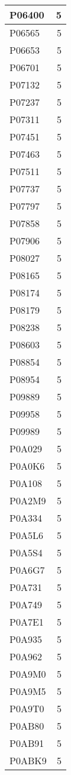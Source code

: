 \documentclass[
]{book}
\theoremstyle{definition}
\theoremstyle{definition}
\theoremstyle{definition}
\theoremstyle{definition}
\theoremstyle{remark}
\begin{document}
\begin{table}
\begin{tabular}{l|r}
\hline
P06400 & 5\\
\hline
P06565 & 5\\
\hline
P06653 & 5\\
\hline
P06701 & 5\\
\hline
P07132 & 5\\
\hline
P07237 & 5\\
\hline
P07311 & 5\\
\hline
P07451 & 5\\
\hline
P07463 & 5\\
\hline
P07511 & 5\\
\hline
P07737 & 5\\
\hline
P07797 & 5\\
\hline
P07858 & 5\\
\hline
P07906 & 5\\
\hline
P08027 & 5\\
\hline
P08165 & 5\\
\hline
P08174 & 5\\
\hline
P08179 & 5\\
\hline
P08238 & 5\\
\hline
P08603 & 5\\
\hline
P08854 & 5\\
\hline
P08954 & 5\\
\hline
P09889 & 5\\
\hline
P09958 & 5\\
\hline
P09989 & 5\\
\hline
P0A029 & 5\\
\hline
P0A0K6 & 5\\
\hline
P0A108 & 5\\
\hline
P0A2M9 & 5\\
\hline
P0A334 & 5\\
\hline
P0A5L6 & 5\\
\hline
P0A5S4 & 5\\
\hline
P0A6G7 & 5\\
\hline
P0A731 & 5\\
\hline
P0A749 & 5\\
\hline
P0A7E1 & 5\\
\hline
P0A935 & 5\\
\hline
P0A962 & 5\\
\hline
P0A9M0 & 5\\
\hline
P0A9M5 & 5\\
\hline
P0A9T0 & 5\\
\hline
P0AB80 & 5\\
\hline
P0AB91 & 5\\
\hline
P0ABK9 & 5\\

\end{tabular}
\end{table}
\end{document}
